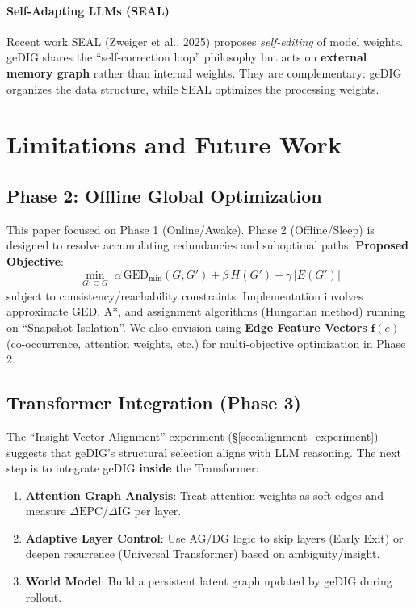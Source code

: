 \documentclass[12pt]{article}
\begin{document}
\paragraph{Self-Adapting LLMs (SEAL)}\;
Recent work SEAL (Zweiger et al., 2025) proposes \emph{self-editing} of model weights. geDIG shares the ``self-correction loop'' philosophy but acts on \textbf{external memory graph} rather than internal weights. They are complementary: geDIG organizes the data structure, while SEAL optimizes the processing weights.

\section{Limitations and Future Work}
\label{sec:limits_future}

\subsection{Phase 2: Offline Global Optimization}
This paper focused on Phase 1 (Online/Awake). Phase 2 (Offline/Sleep) is designed to resolve accumulating redundancies and suboptimal paths.
\textbf{Proposed Objective}:
\[
  \min_{G'\subseteq G} \; \alpha\,\mathrm{GED}_{\min}(G,G') + \beta\,H(G') + \gamma\,|E(G')|
\]
subject to consistency/reachability constraints.
Implementation involves approximate GED, A*, and assignment algorithms (Hungarian method) running on ``Snapshot Isolation''.
We also envision using \textbf{Edge Feature Vectors} $\mathbf{f}(e)$ (co-occurrence, attention weights, etc.) for multi-objective optimization in Phase 2.

\subsection{Transformer Integration (Phase 3)}
The ``Insight Vector Alignment'' experiment (\S\ref{sec:alignment_experiment}) suggests that geDIG's structural selection aligns with LLM reasoning.
The next step is to integrate geDIG \textbf{inside} the Transformer:
\begin{enumerate}
    \item \textbf{Attention Graph Analysis}: Treat attention weights as soft edges and measure $\Delta\mathrm{EPC}/\Delta\mathrm{IG}$ per layer.
    \item \textbf{Adaptive Layer Control}: Use AG/DG logic to skip layers (Early Exit) or deepen recurrence (Universal Transformer) based on ambiguity/insight.
    \item \textbf{World Model}: Build a persistent latent graph updated by geDIG during rollout.
\end{enumerate}
\end{document}
